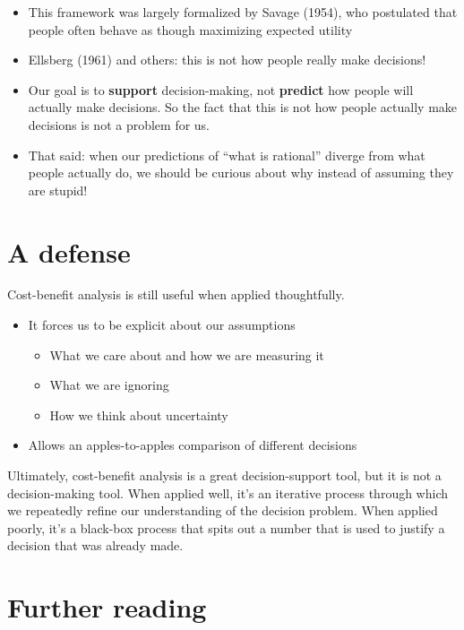\documentclass[
  letterpaper,
  DIV=11,
  numbers=noendperiod]{scrreprt}
\providecommand{\tightlist}{%
  \setlength{\itemsep}{0pt}\setlength{\parskip}{0pt}}
\begin{document}
\begin{itemize}
  \begin{itemize}
  \tightlist
  \item
    This framework was largely formalized by Savage (1954), who
    postulated that people often behave as though maximizing expected
    utility
  \item
    Ellsberg (1961) and others: this is not how people really make
    decisions!
  \item
    Our goal is to \textbf{support} decision-making, not
    \textbf{predict} how people will actually make decisions. So the
    fact that this is not how people actually make decisions is not a
    problem for us.
  \item
    That said: when our predictions of ``what is rational'' diverge from
    what people actually do, we should be curious about why instead of
    assuming they are stupid!
  \end{itemize}
\end{itemize}

\section{A defense}\label{a-defense}

Cost-benefit analysis is still useful when applied thoughtfully.

\begin{itemize}
\tightlist
\item
  It forces us to be explicit about our assumptions

  \begin{itemize}
  \tightlist
  \item
    What we care about and how we are measuring it
  \item
    What we are ignoring
  \item
    How we think about uncertainty
  \end{itemize}
\item
  Allows an apples-to-apples comparison of different decisions
\end{itemize}

Ultimately, cost-benefit analysis is a great decision-support tool, but
it is not a decision-making tool. When applied well, it's an iterative
process through which we repeatedly refine our understanding of the
decision problem. When applied poorly, it's a black-box process that
spits out a number that is used to justify a decision that was already
made.

\section*{Further reading}\label{further-reading-14}
\end{document}
